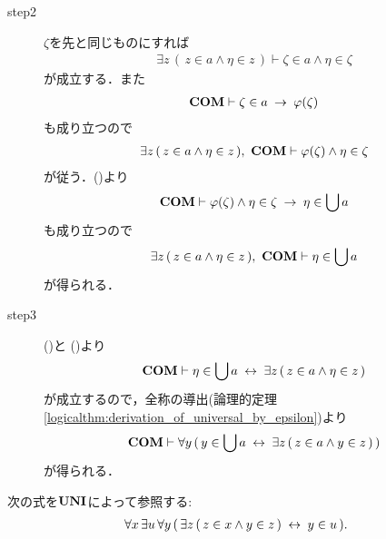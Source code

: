 \begin{sketch}
\begin{description}
			\item[step2]
				$\zeta$を先と同じものにすれば
				\begin{align}
					\exists z\, (\, z \in a \wedge \eta \in z\, )
					\vdash \zeta \in a \wedge \eta \in \zeta
				\end{align}
				が成立する．また
				\begin{align}
					\mbox{\bf COM} \vdash \zeta \in a \hspace{0.25em}\rightarrow\hspace{0.25em} \varphi(\zeta)
				\end{align}
				も成り立つので
				\begin{align}
					\exists z\, (\, z \in a \wedge \eta \in z\, ),\ \COMAX
					\vdash \varphi(\zeta) \wedge \eta \in \zeta
				\end{align}
				が従う．()より
				\begin{align}
					\mbox{\bf COM} \vdash \varphi(\zeta) \wedge \eta \in \zeta
					\hspace{0.25em}\rightarrow\hspace{0.25em} \eta \in \bigcup a
				\end{align}
				も成り立つので
				\begin{align}
					\exists z\, (\, z \in a \wedge \eta \in z\, ),\ \COMAX \vdash 
					\eta \in \bigcup a
					\label{fom:comprehension_of_unions_3}
				\end{align}
				が得られる．
			
			\item[step3]
				()と
				()より
				\begin{align}
					\mbox{\bf COM} \vdash \eta \in \bigcup a 
					\hspace{0.25em}\leftrightarrow\hspace{0.25em} \exists z\, (\, z \in a \wedge \eta \in z\, )
				\end{align}
				が成立するので，全称の導出(論理的定理\ref{logicalthm:derivation_of_universal_by_epsilon})より
				\begin{align}
					\mbox{\bf COM} \vdash \forall y\, (\, y \in \bigcup a 
					\hspace{0.25em}\leftrightarrow\hspace{0.25em} \exists z\, (\, z \in a \wedge y \in z\, )\, )
				\end{align}
				が得られる．
				\QED
		\end{description}
	\end{sketch}
	
	\begin{screen}
		\begin{axm}[合併の公理]
			次の式を$\mbox{{\bf UNI}}$によって参照する:
			\begin{align}
				\forall x\, \exists u\, \forall y\, (\, \exists z\, (\, z \in x \wedge y \in z\, ) \hspace{0.25em}\leftrightarrow\hspace{0.25em} y \in u\, ).
			\end{align}
		\end{axm}
	\end{screen}
	

